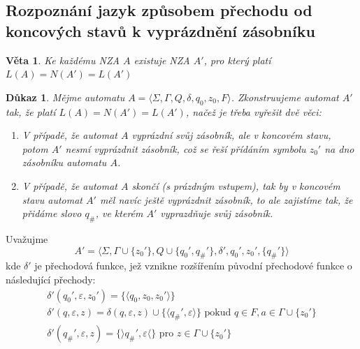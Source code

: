 \documentclass[10pt, a4paper, titlepage]{article}
\theoremstyle{note}
\newtheorem{veta}{\textbf{Věta}}
\newtheorem{dukaz}{\textbf{Důkaz}}
\begin{document}
\subsection{Rozpoznání jazyk způsobem přechodu od koncových stavů k vyprázdnění zásobníku}
\begin{veta}
Ke každému NZA $A$ existuje NZA $A'$, pro který platí $L(A) = N(A') = L(A')$
\end{veta}
\begin{dukaz}
Mějme automatu $A = \langle \Sigma, \Gamma, Q, \delta, q_0, z_0, F \rangle$. Zkonstruujeme automat $A'$ tak, že
platí $L(A) = N(A') = L(A')$, načež je třeba vyřešit dvě věci:
\begin{enumerate}
\item
V případě, že automat $A$ vyprázdní svůj zásobník, ale v koncovém stavu, potom $A'$ nesmí vyprázdnit zásobník, což se řeší
přídáním symbolu $z_0'$ na dno zásobníku automatu $A$.

\item
V případě, že automat $A$ skončí (s prázdným vstupem), tak by v koncovém stavu automat $A'$ měl navíc ještě vyprázdnit
zásobník, to ale zajistíme tak, že přidáme slovo $q_\#$, ve kterém $A'$ vyprazdňuje svůj zásobník.
\end{enumerate} 
\end{dukaz}

Uvažujme
$$
A' = \langle \Sigma, \Gamma \cup \lbrace z_{0}' \rbrace, Q \cup \lbrace q_{0}', q_{\#}' \rbrace, \delta',
q_0', z_0', \lbrace q_{\#}' \rbrace \rangle
$$
kde $\delta'$ je přechodová funkce, jež vznikne rozšířením původní přechodové funkce o následující přechody:
\begin{gather*}
\delta'(q_0', \varepsilon, z_0') = \lbrace \langle q_0, z_0, z_0' \rangle \rbrace \\
\delta'(q, \varepsilon, z) = \delta(q, \varepsilon, z) \cup \lbrace \langle q_{\#}', \varepsilon \rangle \rbrace \text { pokud }
q \in F, a \in \Gamma \cup \lbrace z_0' \rbrace \\
\delta'(q_{\#}', \varepsilon, z) = \lbrace \rangle q_{\#}', \varepsilon \langle \rbrace \text{ pro } z \in \Gamma \cup \lbrace z_0' \rbrace
\end{gather*}
\end{document}
